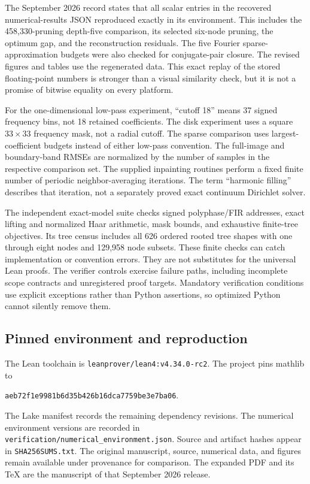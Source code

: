 \documentclass[11pt,letterpaper]{article}
\theoremstyle{plain}
\theoremstyle{plain}
\theoremstyle{plain}
\theoremstyle{definition}
\theoremstyle{definition}
\theoremstyle{definition}
\theoremstyle{definition}
\theoremstyle{remark}
\theoremstyle{remark}
\theoremstyle{remark}
\theoremstyle{remark}
\begin{document}
The September 2026 record states that all scalar entries in the recovered numerical-results JSON reproduced exactly in its environment. This includes the 458,330-pruning depth-five comparison, its selected six-node pruning, the optimum gap, and the reconstruction residuals. The five Fourier sparse-approximation budgets were also checked for conjugate-pair closure. The revised figures and tables use the regenerated data. This exact replay of the stored floating-point numbers is stronger than a visual similarity check, but it is not a promise of bitwise equality on every platform.

For the one-dimensional low-pass experiment, ``cutoff 18'' means 37 signed frequency bins, not 18 retained coefficients. The disk experiment uses a square $33\times33$ frequency mask, not a radial cutoff. The sparse comparison uses largest-coefficient budgets instead of either low-pass convention. The full-image and boundary-band RMSEs are normalized by the number of samples in the respective comparison set. The supplied inpainting routines perform a fixed finite number of periodic neighbor-averaging iterations. The term ``harmonic filling'' describes that iteration, not a separately proved exact continuum Dirichlet solver.

The independent exact-model suite checks signed polyphase/FIR addresses, exact lifting and normalized Haar arithmetic, mask bounds, and exhaustive finite-tree objectives. Its tree census includes all 626 ordered rooted tree shapes with one through eight nodes and 129,958 node subsets. These finite checks can catch implementation or convention errors. They are not substitutes for the universal Lean proofs. The verifier controls exercise failure paths, including incomplete scope contracts and unregistered proof targets. Mandatory verification conditions use explicit exceptions rather than Python assertions, so optimized Python cannot silently remove them.

\subsection{Pinned environment and reproduction}

The Lean toolchain is \texttt{leanprover/lean4:v4.34.0-rc2}. The project pins mathlib to
\begin{center}\small\texttt{aeb72f1e9981b6d35b426b16dca7759be3e7ba06}.\end{center}
The Lake manifest records the remaining dependency revisions. The numerical environment versions are recorded in \texttt{verification/numerical\_environment.json}. Source and artifact hashes appear in \texttt{SHA256SUMS.txt}. The original manuscript, source, numerical data, and figures remain available under provenance for comparison. The expanded PDF and its TeX are the manuscript of that September 2026 release.
\end{document}

